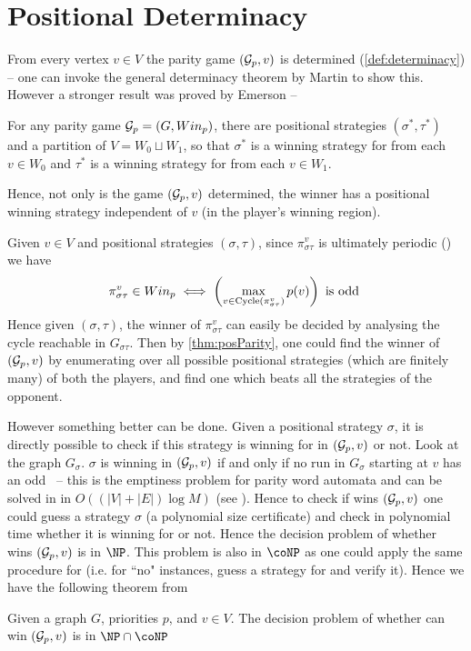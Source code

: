 \section{Positional Determinacy}
From every vertex $v \in V$ the parity game $(\mathcal{G}_p,v)$ is determined (\autoref{def:determinacy}) -- one can invoke the general determinacy theorem by Martin \cite{martin_borel_1975}  to show this. However a stronger result was proved by Emerson \cite{emerson_automata_1985} --


\begin{theorem}
    \label{thm:posParity}
    For any parity game $\mathcal{G}_p=(G,Win_p)$, there are positional strategies $(\sigma^*,\tau^*)$ and a partition of $V = W_0 \sqcup W_1$, so that $\sigma^*$ is a winning strategy for  from each $v \in W_0$ and $\tau^*$ is a winning strategy for  from each $v \in W_1$.
\end{theorem}
Hence, not only is the game $(\mathcal{G}_p,v)$ determined, the winner has a positional winning strategy independent of $v$ (in the player's winning region).

Given $v \in V$ and positional strategies $(\sigma,\tau)$, since $\pi^{v}_{\sigma\tau}$ is ultimately periodic () we have
\[
    \pi^{v}_{\sigma\tau} \in Win_p \iff \left( \max_{v \in \operatorname{Cycle}(\pi^v_{\sigma\tau})} p(v)\right) \text{ is odd }
\]
Hence given $(\sigma,\tau)$, the winner of $\pi^v_{\sigma\tau}$ can easily be decided by analysing the cycle reachable in $G_{\sigma\tau}$.  Then by \autoref{thm:posParity}, one could find the winner of $(\mathcal{G}_p,v)$ by enumerating over all possible positional strategies (which are finitely many) of both the players, and find one which beats all the strategies of the opponent.

However something better can be done. Given a positional strategy $\sigma$, it is directly possible to check if this strategy is winning for  in $(\mathcal{G}_p,v)$ or not. Look at the graph $G_\sigma$. $\sigma$ is winning in $(\mathcal{G}_p,v)$ if and only if no run in $G_\sigma$ starting at $v$ has an odd \mip\ -- this is the emptiness problem for parity word automata and can be solved in in $O\left((|V|+|E|) \log M\right)$ (see \cite{king_complexity_2001}). Hence to check if  wins $(\mathcal{G}_p,v)$ one could guess a strategy $\sigma$ (a polynomial size certificate) and check in polynomial time whether it is winning for  or not. Hence the decision problem of whether  wins $(\mathcal{G}_p,v)$ is in $\NP$. This problem is also in $\coNP$ as one could apply the same procedure for  (i.e. for ``no" instances, guess a strategy for  and verify it). Hence we have the following theorem from \cite{thomas2002automata}
\begin{theorem}
    \label{thm:np}
    Given a graph $G$, priorities $p$, and $v \in V$. The decision problem of whether  can win $(\mathcal{G}_p,v)$ is in $\NP \cap \coNP$
\end{theorem}

